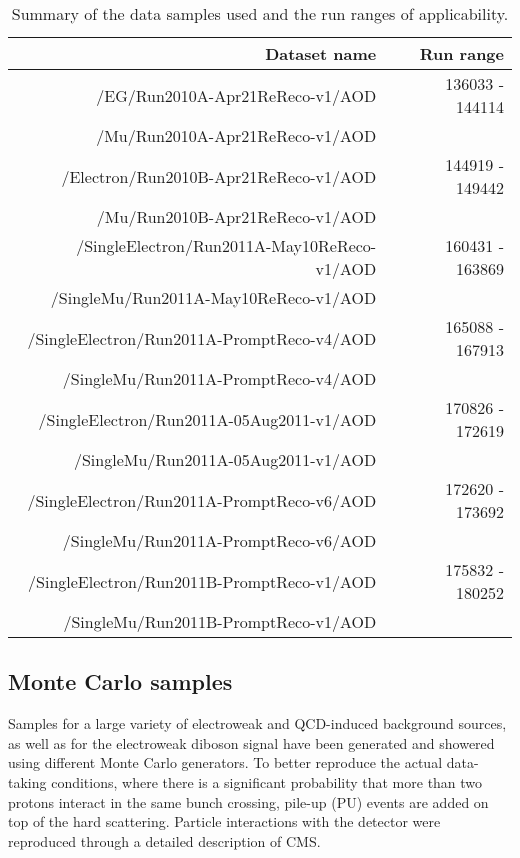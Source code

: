 \begin{table}[htbp!]
  \begin{center}
  \begin{tabular}{r|r}
  \hline  \hline
  Dataset name & Run range \\
  \hline
  /EG/Run2010A-Apr21ReReco-v1/AOD   & 136033 - 144114  \\
  /Mu/Run2010A-Apr21ReReco-v1/AOD   &            \\ 
  \hline
  /Electron/Run2010B-Apr21ReReco-v1/AOD   &  144919 - 149442  \\
  /Mu/Run2010B-Apr21ReReco-v1/AOD         &             \\
  \hline
  /SingleElectron/Run2011A-May10ReReco-v1/AOD   & 160431 - 163869 \\
  /SingleMu/Run2011A-May10ReReco-v1/AOD         &                 \\
  \hline                                     
  /SingleElectron/Run2011A-PromptReco-v4/AOD       & 165088 - 167913   \\
  /SingleMu/Run2011A-PromptReco-v4/AOD          &                 \\
  \hline                                     
  /SingleElectron/Run2011A-05Aug2011-v1/AOD        & 170826 - 172619 \\
  /SingleMu/Run2011A-05Aug2011-v1/AOD           &                 \\
  \hline                                     
  /SingleElectron/Run2011A-PromptReco-v6/AOD       & 172620 - 173692 \\
  /SingleMu/Run2011A-PromptReco-v6/AOD          &                 \\
  \hline                                     
  /SingleElectron/Run2011B-PromptReco-v1/AOD       & 175832 - 180252 \\
 /SingleMu/Run2011B-PromptReco-v1/AOD          &                 \\
  \hline  \hline
  \end{tabular}
  \end{center}
  \caption{Summary of the data samples used and the run ranges of applicability.}
  \label{tab:datasets}
\end{table}%
\subsection{Monte Carlo samples}
Samples for a large variety of electroweak and QCD-induced background sources, 
as well as for the electroweak diboson signal 
have been generated and showered using different Monte Carlo generators.
To better reproduce the actual data-taking conditions, where there is a significant probability
that more than two protons interact in the same bunch crossing, pile-up (PU) events are
added on top of the hard scattering. Particle interactions with the detector were reproduced through
a detailed description of CMS.


